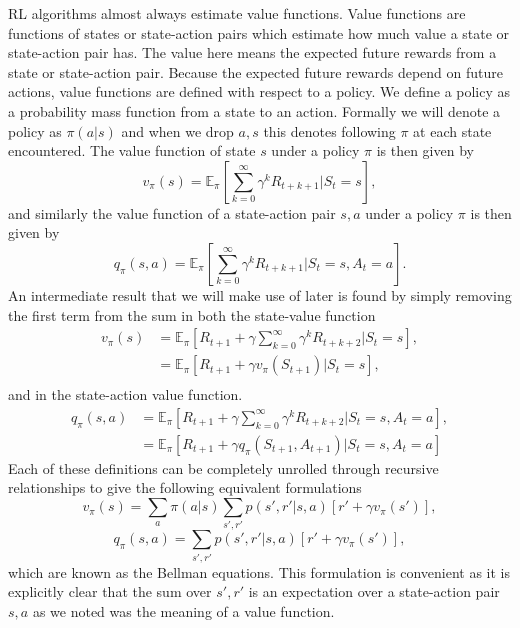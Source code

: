 \documentclass{article}
\newcommand{\mb}{\mathbb}
\begin{document}
RL algorithms almost always estimate value functions. Value functions are functions of states or state-action pairs which estimate how much value a state or state-action pair has. The value here means the expected future rewards from a state or state-action pair. Because the expected future rewards depend on future actions, value functions are defined with respect to a policy. We define a policy as a probability mass function from a state to an action. Formally we will denote a policy as $\pi(a|s)$ and when we drop $a, s$ this denotes following $\pi$ at each state encountered. The value function of state $s$ under a policy $\pi$ is then given by
\begin{equation}
v_\pi(s) = \mb{E}_\pi[\sum_{k=0}^\infty \gamma^k R_{t+k+1}|S_t=s],
\end{equation}
and similarly the value function of a state-action pair $s, a$ under a policy $\pi$ is then given by
\begin{equation}
q_\pi(s, a) = \mb{E}_\pi[\sum_{k=0}^\infty \gamma^k R_{t+k+1}|S_t=s, A_t=a].
\end{equation}
An intermediate result that we will make use of later is found by simply removing the first term from the sum in both the state-value function 
\begin{equation}\label{eq:inter_v}
\begin{split}
v_\pi(s) &= \mb{E}_\pi[R_{t+1} + \gamma\sum_{k=0}^\infty \gamma^k R_{t+k+2}|S_t=s], \\
&= \mb{E}_\pi[R_{t+1} + \gamma v_\pi(S_{t+1})|S_t=s], \\
\end{split}
\end{equation}
and in the state-action value function.
\begin{equation}\label{eq:inter_q}
\begin{split}
q_\pi(s, a) &= \mb{E}_\pi[R_{t+1} + \gamma\sum_{k=0}^\infty \gamma^k R_{t+k+2}|S_t=s, A_t=a], \\
&= \mb{E}_\pi[R_{t+1} + \gamma q_\pi(S_{t+1}, A_{t+1})|S_t=s, A_t=a]
\end{split}
\end{equation}
Each of these definitions can be completely unrolled through recursive relationships to give the following equivalent formulations
\begin{equation}
v_\pi(s) = \sum_a \pi(a|s)\sum_{s',r'}p(s', r'|s, a)[r' + \gamma v_\pi(s')],
\end{equation}
\begin{equation}
q_\pi(s, a) = \sum_{s',r'}p(s', r'|s, a)[r' + \gamma v_\pi(s')],
\end{equation}
which are known as the Bellman equations. This formulation is convenient as it is explicitly clear that the sum over $s', r'$ is an expectation over a state-action pair $s, a$ as we noted was the meaning of a value function.
\end{document}
